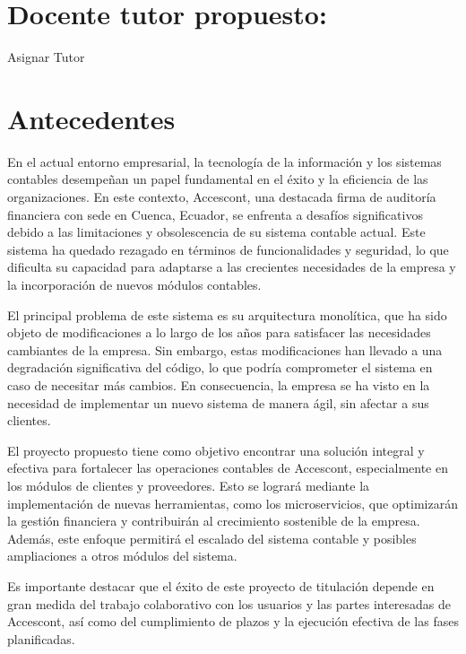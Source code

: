 \documentclass{article}
\begin{document}
\section{Docente tutor propuesto:   }
\begin{center}
Asignar Tutor
\end{center}
\section{Antecedentes}

En el actual entorno empresarial, la tecnología de la información y los sistemas contables desempeñan un papel fundamental en el éxito y la eficiencia de las organizaciones. En este contexto, Accescont, una destacada firma de auditoría financiera con sede en Cuenca, Ecuador, se enfrenta a desafíos significativos debido a las limitaciones y obsolescencia de su sistema contable actual. Este sistema ha quedado rezagado en términos de funcionalidades y seguridad, lo que dificulta su capacidad para adaptarse a las crecientes necesidades de la empresa y la incorporación de nuevos módulos contables.

El principal problema de este sistema es su arquitectura monolítica, que ha sido objeto de modificaciones a lo largo de los años para satisfacer las necesidades cambiantes de la empresa. Sin embargo, estas modificaciones han llevado a una degradación significativa del código, lo que podría comprometer el sistema en caso de necesitar más cambios. En consecuencia, la empresa se ha visto en la necesidad de implementar un nuevo sistema de manera ágil, sin afectar a sus clientes.

El proyecto propuesto tiene como objetivo encontrar una solución integral y efectiva para fortalecer las operaciones contables de Accescont, especialmente en los módulos de clientes y proveedores. Esto se logrará mediante la implementación de nuevas herramientas, como los microservicios, que optimizarán la gestión financiera y contribuirán al crecimiento sostenible de la empresa. Además, este enfoque permitirá el escalado del sistema contable y posibles ampliaciones a otros módulos del sistema.

Es importante destacar que el éxito de este proyecto de titulación depende en gran medida del trabajo colaborativo con los usuarios y las partes interesadas de Accescont, así como del cumplimiento de plazos y la ejecución efectiva de las fases planificadas. \cite{Smith2023}

       
\end{document}
